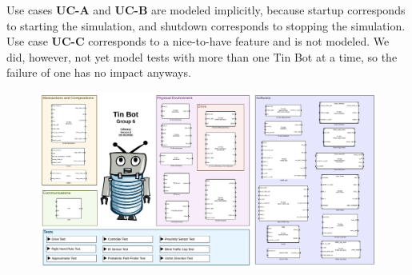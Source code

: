 \documentclass[a4paper,parskip,headheight=38pt]{scrartcl} %
\begin{document}

Use cases \textbf{UC-A} and \textbf{UC-B} are modeled implicitly, because startup corresponds to starting the simulation, and shutdown corresponds to stopping the simulation.
Use case \textbf{UC-C} corresponds to a nice-to-have feature and is not modeled. We did, however, not yet model tests with more than one Tin Bot at a time, so the failure of one has no impact anyways.

\pagestyle{empty}

\begin{landscape}
\begin{figure}[h]
\centering
\includegraphics[width=26cm]{library.pdf}
\label{}
\end{figure}
\end{landscape}
\end{document}
